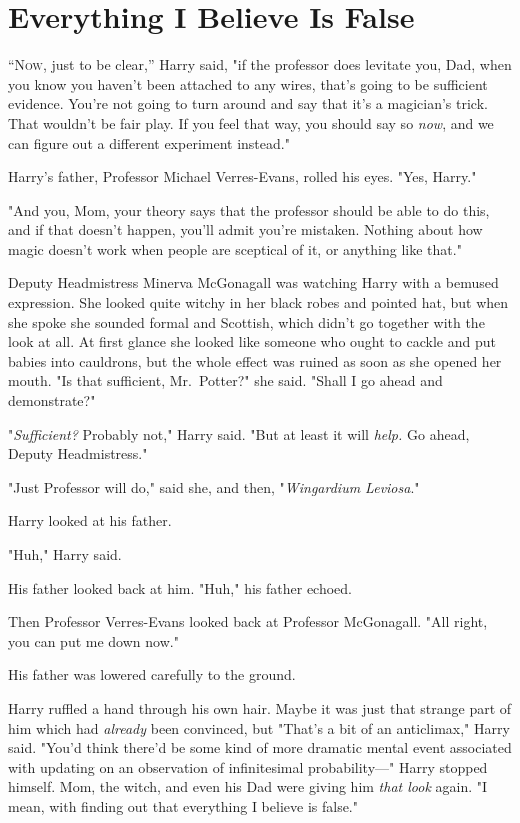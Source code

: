 \chapter{Everything I Believe Is False}

\lettrine{“N}{ow}, just to be clear,'' Harry said, "if the professor does levitate you, Dad,
when you know you haven't been attached to any wires, that's going to be
sufficient evidence. You're not going to turn around and say that it's a
magician's trick. That wouldn't be fair play. If you feel that way, you should
say so \emph{now}, and we can figure out a different experiment instead."

Harry's father, Professor Michael Verres-Evans, rolled his eyes. "Yes, Harry."

"And you, Mom, your theory says that the professor should be able to do this,
and if that doesn't happen, you'll admit you're mistaken. Nothing about how
magic doesn't work when people are sceptical of it, or anything like that."

Deputy Headmistress Minerva McGonagall was watching Harry with a bemused
expression. She looked quite witchy in her black robes and pointed hat, but
when she spoke she sounded formal and Scottish, which didn't go together with
the look at all. At first glance she looked like someone who ought to cackle
and put babies into cauldrons, but the whole effect was ruined as soon as she
opened her mouth. "Is that sufficient, Mr.~Potter?" she said. "Shall I go ahead
and demonstrate?"

"\emph{Sufficient?} Probably not," Harry said. "But at least it will
\emph{help.} Go ahead, Deputy Headmistress."

"Just Professor will do," said she, and then, "\emph{Wingardium Leviosa}."

Harry looked at his father.

"Huh," Harry said.

His father looked back at him. "Huh," his father echoed.

Then Professor Verres-Evans looked back at Professor McGonagall. "All right,
you can put me down now."

His father was lowered carefully to the ground.

Harry ruffled a hand through his own hair. Maybe it was just that strange part
of him which had \emph{already} been convinced, but{\el} "That's a bit of an
anticlimax," Harry said. "You'd think there'd be some kind of more dramatic
mental event associated with updating on an observation of infinitesimal
probability\mbox{---}" Harry stopped himself. Mom, the witch, and even his Dad were
giving him \emph{that look} again. "I mean, with finding out that everything I
believe is false."

